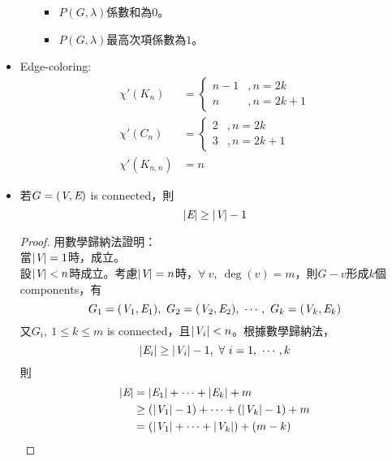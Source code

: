 \begin{itemize}
\begin{itemize}
\begin{itemize}
            \item $P(G, \lambda)$係數和為$0$。
            \item $P(G, \lambda)$最高次項係數為$1$。
        \end{itemize}
    \end{itemize}
    \item Edge-coloring: \begin{equation}
        \begin{aligned}
            \chi'(K_n) & = \begin{cases}
                n - 1 &, n = 2k \\
                n &, n = 2k + 1
            \end{cases} \\
            \chi'(C_n) & = \begin{cases}
                2 &, n = 2k \\
                3 &, n = 2k + 1
            \end{cases} \\
            \chi'(K_{n , n}) & = n
        \end{aligned}
    \end{equation}
    \item 若$G = (\textit{V}, \textit{E})$ is connected，則\begin{equation}
        |\textit{E}| \ge |\textit{V}| - 1    
    \end{equation} \begin{proof}
        用數學歸納法證明： \\
        當$|\textit{V}| = 1$時，成立。 \\
        設$|\textit{V}| < n$時成立。考慮$|\textit{V}| = n$時，$\forall \ v, \ \deg(v) = m$，則$G - v$形成$k$個components，有\begin{equation}
            G_1 = (\V_1, \E_1), \ G_2 = (\V_2, \E_2), \ \cdots, \ G_k = (\V_k, \E_k)
        \end{equation} 又$G_i, \ 1 \le k \le m$ is connected，且$|\textit{V}_i| < n$。根據數學歸納法，\begin{equation}
            |\textit{E}_i| \ge |\textit{V}_i| - 1, \ \forall \ i = 1, \ \cdots, k
        \end{equation} 則 \begin{equation}
            \begin{aligned}
                |\E| & = |\E_1| + \cdots + |\E_k| + m \\
                & \ge (|\V_1| - 1) + \cdots + (|\V_k| - 1) + m \\
                & = (|\V_1| + \cdots + |\V_k|) + (m - k) \\

\end{aligned}
\end{equation}
\end{proof}
\end{itemize}
